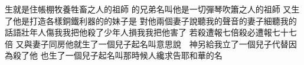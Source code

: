 生\chientien {}就是住帳棚牧養牲畜之人的祖師\chuan 
{}的兄弟名叫\yuentien 他是一切彈琴吹簫之人的祖師\chuan 
{}又生了\chientien 他是打造各樣銅鐵利器的\chientien {}的妹子是\chuan 
{}對他兩個妻子說\chientien{}\chientien{}\chientien 聽我的聲音\chientien {}的妻子細聽我的話語\chientien 壯年人傷我\chientien 我把他殺了\chientien 少年人損我\chientien 我把他害了\yuentien {}
若殺\chientien 遭報七倍\chientien 殺\chientien 必遭報七十七倍\chuan\Chuan
{}又與妻子同房\chientien 他就生了一個兒子\chientien 起名叫\chientien 意思說\chientien 　神另給我立了一個兒子代替\hss\linebreak{}\chientien 因為殺了他\chuan 
{}也生了一個兒子\chientien 起名叫\chuan 那時候人纔求告耶和華的名\chuan 
